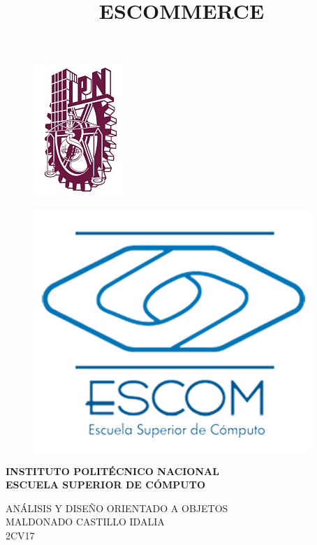 \documentclass[14pt]{article}
\title{ESCOMMERCE}
\begin{document}
    \begin{center}

        \begin{figure}[htbl!]
            \begin{minipage}[b]{0.5\linewidth}
                \includegraphics[height=0.4\textwidth]{IPN.jpg}
                \label{fig:IPN}
            \end{minipage}
            \hspace{2.5cm}
            \begin{minipage}[b]{0.5\linewidth}
                \centering
                \includegraphics[height=0.4\textwidth]{ESCOM.png}
                \label{fig:ESCOM}
            \end{minipage}
        \end{figure}

        \vspace{1cm}

        \fontsize{14}{baseline skip}\textbf{INSTITUTO POLITÉCNICO NACIONAL \\
        \vspace{0.3cm}ESCUELA SUPERIOR DE CÓMPUTO}

        \vspace{3cm}

        \fontsize{14}{baseline skip} ANÁLISIS Y DISEÑO ORIENTADO A OBJETOS\\ \vspace{0.5cm}MALDONADO CASTILLO IDALIA\\ \vspace{0.5cm}2CV17


\end{center}
\end{document}
